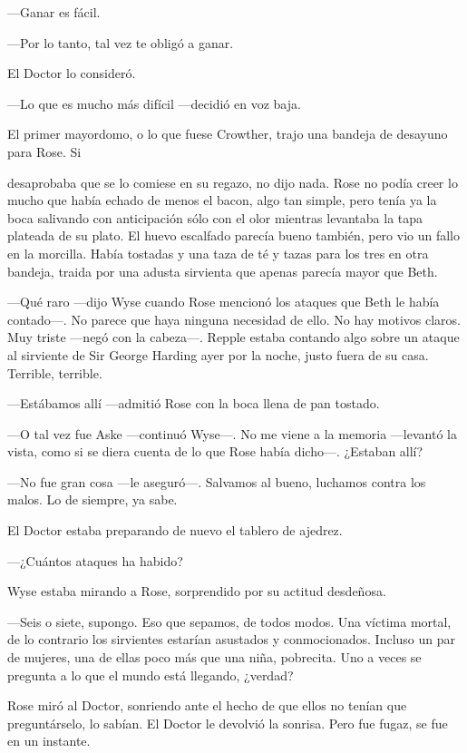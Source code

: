 {---Ganar es fácil.}

{---Por lo tanto, tal vez te obligó a ganar.}

{El Doctor lo consideró.}

{---Lo que es mucho más difícil ---decidió en voz baja.}

{El primer mayordomo, o lo que fuese Crowther, trajo una bandeja de
desayuno para Rose. Si}

{desaprobaba que se lo comiese en su regazo, no dijo nada. Rose no podía
	creer lo mucho que había echado de menos el bacon, algo tan simple, pero
	tenía ya la boca salivando con anticipación sólo con el olor mientras
	levantaba la tapa plateada de su plato. El huevo escalfado parecía bueno
	también, pero vio un fallo en la morcilla. Había tostadas y una taza de
	té y tazas para los tres en otra bandeja, traida por una adusta
sirvienta que apenas parecía mayor que Beth.}

{---Qué raro ---dijo Wyse cuando Rose mencionó los ataques que Beth le
	había contado---. No parece que haya ninguna necesidad de ello. No hay
	motivos claros. Muy triste ---negó con la cabeza---. Repple estaba
	contando algo sobre un ataque al sirviente de Sir George Harding ayer
por la noche, justo fuera de su casa. Terrible, terrible.}

{---Estábamos allí ---admitió Rose con la boca llena de pan tostado.}

{---O tal vez fue Aske ---continuó Wyse---. No me viene a la memoria
	---levantó la vista, como si se diera cuenta de lo que Rose había
dicho---. ¿Estaban allí?}

{---No fue gran cosa ---le aseguró---. Salvamos al bueno, luchamos
contra los malos. Lo de siempre, ya sabe.}

{El Doctor estaba preparando de nuevo el tablero de ajedrez.}

{---¿Cuántos ataques ha habido?}

{Wyse estaba mirando a Rose, sorprendido por su actitud desdeñosa.}

{---Seis o siete, supongo. Eso que sepamos, de todos modos. Una víctima
	mortal, de lo contrario los sirvientes estarían asustados y
	conmocionados. Incluso un par de mujeres, una de ellas poco más que una
	niña, pobrecita. Uno a veces se pregunta a lo que el mundo está
llegando, ¿verdad?}

{Rose miró al Doctor, sonriendo ante el hecho de que ellos no tenían que
	preguntárselo, lo sabían. El Doctor le devolvió la sonrisa. Pero fue
fugaz, se fue en un instante.}

